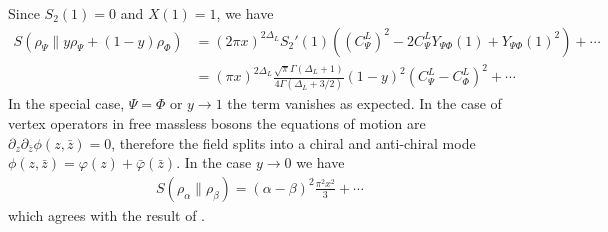 \documentclass[11pt]{article}
\newcommand{\nn}{\nonumber}
\newcommand{\lb}{\left(}
\newcommand{\rb}{\right)}
\newcommand{\NL}[1]{\textcolor{blue}{#1}}
\begin{document}
  Since $S_{2}(1)=0$ and $X(1)=1$, we have
   \begin{align}
  S(\rho_{\Psi}\|y\rho_{\Psi}+(1-y)\rho_{\Phi}) & = (2\pi x)^{2\Delta_L}S_{2}'(1)\lb {(C_{\Psi}^L)}^{2}-2C_{\Psi}^LY_{\Psi\Phi}(1)+Y_{\Psi\Phi}(1)^{2}\rb+\cdots\nn                \\
   & =(\pi x)^{2\Delta_L}\frac{\sqrt{\pi}\Gamma(\Delta_{L}+1)}{4\Gamma(\Delta_{L}+3/2)}(1-y)^{2}(C_{\Psi}^L-C_{\Phi}^L)^{2}+\cdots
  \end{align}
  In the special case,
  $\Psi =\Phi$ or $y\to 1$ the term vanishes as expected. In the case of vertex
  operators in free massless bosons the equations of motion are $\partial_z\partial_{\bar{z}}\phi(z,\bar{z})=0$, therefore the field splits into a chiral and anti-chiral mode $\phi(z,\bar{z})=\varphi(z)+\bar{\varphi}(\bar{z})$. In the case $y\to 0$ we have
 \begin{align}
  S(\rho_\alpha\|\rho_\beta)=(\alpha-\beta)^2\frac{\pi^2 x^2}{3}+\cdots 
 \end{align}
 which agrees with the result of \cite{Lashkari_2014,S_rosi_2016}.
\end{document}

